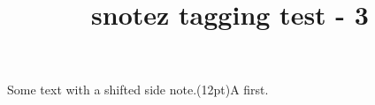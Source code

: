 \documentclass{article}
\title{snotez tagging test - 3}
\begin{document}
Some text with a shifted side note.\sidenote(12pt){A first.}
\end{document}
